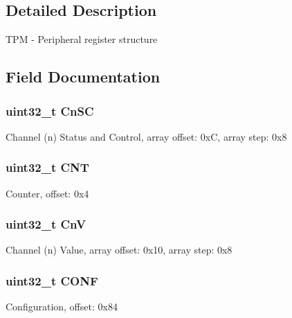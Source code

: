 \subsection{Detailed Description}
T\+P\+M -\/ Peripheral register structure 

\subsection{Field Documentation}
\hypertarget{struct_t_p_m___mem_map_af69e08c8d2a99f6e1215f653135e5587}{}
\subsubsection[{Cn\+S\+C}]{\setlength{\rightskip}{0pt plus 5cm}uint32\+\_\+t Cn\+S\+C}\label{struct_t_p_m___mem_map_af69e08c8d2a99f6e1215f653135e5587}
Channel (n) Status and Control, array offset\+: 0x\+C, array step\+: 0x8 \hypertarget{struct_t_p_m___mem_map_a6fca6863f3eb037bb9f776358c88d2be}{}
\subsubsection[{C\+N\+T}]{\setlength{\rightskip}{0pt plus 5cm}uint32\+\_\+t C\+N\+T}\label{struct_t_p_m___mem_map_a6fca6863f3eb037bb9f776358c88d2be}
Counter, offset\+: 0x4 \hypertarget{struct_t_p_m___mem_map_aba601a937c72cffd0da22ba83b8bafad}{}
\subsubsection[{Cn\+V}]{\setlength{\rightskip}{0pt plus 5cm}uint32\+\_\+t Cn\+V}\label{struct_t_p_m___mem_map_aba601a937c72cffd0da22ba83b8bafad}
Channel (n) Value, array offset\+: 0x10, array step\+: 0x8 \hypertarget{struct_t_p_m___mem_map_a4e5e7db73f5f5cf620fd18197bebf134}{}
\subsubsection[{C\+O\+N\+F}]{\setlength{\rightskip}{0pt plus 5cm}uint32\+\_\+t C\+O\+N\+F}\label{struct_t_p_m___mem_map_a4e5e7db73f5f5cf620fd18197bebf134}
Configuration, offset\+: 0x84 \hypertarget{struct_t_p_m___mem_map_a6a5f9ba7d911c8faacbe7b1f4f697c36}{}

